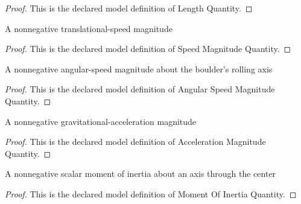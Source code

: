 \begin{proof}
  This is the declared model definition of Length Quantity.
\end{proof}
\begin{definition}
  \label{def:physics:phyx-mini-0789:phyxminiproblems-problemphyxmini0789-speedmagnitudequantity}
  A nonnegative translational-speed magnitude
\end{definition}
\begin{proof}
  This is the declared model definition of Speed Magnitude Quantity.
\end{proof}
\begin{definition}
  \label{def:physics:phyx-mini-0789:phyxminiproblems-problemphyxmini0789-angularspeedmagnitudequantity}
  A nonnegative angular-speed magnitude about the boulder's rolling axis
\end{definition}
\begin{proof}
  This is the declared model definition of Angular Speed Magnitude Quantity.
\end{proof}
\begin{definition}
  \label{def:physics:phyx-mini-0789:phyxminiproblems-problemphyxmini0789-accelerationmagnitudequantity}
  A nonnegative gravitational-acceleration magnitude
\end{definition}
\begin{proof}
  This is the declared model definition of Acceleration Magnitude Quantity.
\end{proof}
\begin{definition}
  \label{def:physics:phyx-mini-0789:phyxminiproblems-problemphyxmini0789-momentofinertiaquantity}
  A nonnegative scalar moment of inertia about an axis through the center
\end{definition}
\begin{proof}
  This is the declared model definition of Moment Of Inertia Quantity.
\end{proof}
